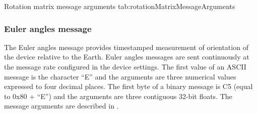 \begingroup
    \def\tempArgumentA{Rotation matrix XX element}
    \def\tempArgumentB{Rotation matrix XY element}
    \def\tempArgumentC{Rotation matrix XZ element}
    \def\tempArgumentD{Rotation matrix YX element}
    \def\tempArgumentE{Rotation matrix YY element}
    \def\tempArgumentF{Rotation matrix YZ element}
    \def\tempArgumentG{Rotation matrix ZX element}
    \def\tempArgumentH{Rotation matrix ZY element}
    \def\tempArgumentI{Rotation matrix ZZ element}
    \dataMessageTable
    {Rotation matrix message arguments}
    {tab:rotationMatrixMessageArguments}
\endgroup

\begingroup
    \def\tempNameA{Rotation matrix XX element}
    \def\tempNameB{Rotation matrix XY element}
    \def\tempNameC{Rotation matrix XZ element}
    \def\tempNameD{Rotation matrix YX element}
    \def\tempNameE{Rotation matrix YY element}
    \def\tempNameF{Rotation matrix YZ element}
    \def\tempNameG{Rotation matrix ZX element}
    \def\tempNameH{Rotation matrix ZY element}
    \def\tempNameI{Rotation matrix ZZ element}
    \def\tempValueA{1}
    \def\tempValueB{0}
    \def\tempValueC{0}
    \def\tempValueD{0}
    \def\tempValueE{1}
    \def\tempValueF{0}
    \def\tempValueG{0}
    \def\tempValueH{0}
    \def\tempValueI{1}
    \def\tempAsciiFirst{R}
    \def\tempAsciiA{1.0000}
    \def\tempAsciiB{0.0000}
    \def\tempAsciiC{0.0000}
    \def\tempAsciiD{0.0000}
    \def\tempAsciiE{1.0000}
    \def\tempAsciiF{0.0000}
    \def\tempAsciiG{0.0000}
    \def\tempAsciiH{0.0000}
    \def\tempAsciiI{1.\linebreak0000} %
    \def\tempBinaryFirst{D2}
    \def\tempBinaryA{00 00 80 3F}
    \def\tempBinaryB{00 00 00 00}
    \def\tempBinaryC{00 00 00 00}
    \def\tempBinaryD{00 00 00 00}
    \def\tempBinaryE{00 00 80 3F}
    \def\tempBinaryF{00 00 00 00}
    \def\tempBinaryG{00 00 00 00}
    \def\tempBinaryH{00 00 00 00}
    \def\tempBinaryI{00 00 80 3F}
    \dataMessageExample
\endgroup

\subsubsection{Euler angles message}

The Euler angles message provides timestamped measurement of orientation of the device relative to the Earth.  Euler angles messages are sent continuously at the message rate configured in the device settings.  The first value of an \ac{ASCII} message is the character \enquote{E} and the arguments are three numerical values expressed to four decimal places.  The first byte of a binary message is C5 (equal to 0x80 + \enquote{E}) and the arguments are three contiguous 32-bit floats.  The message arguments are described in .

